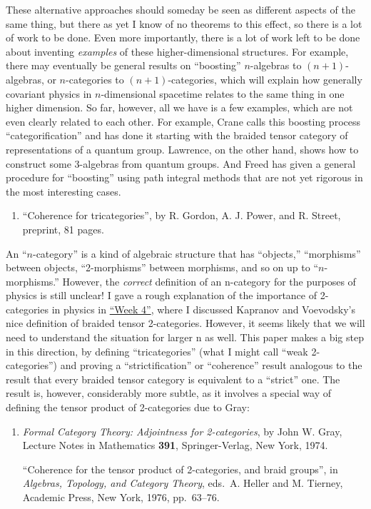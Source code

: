 \documentclass{article}
\def\tightlist{}
\begin{document}
These alternative approaches should someday be seen as different aspects
of the same thing, but there as yet I know of no theorems to this
effect, so there is a lot of work to be done. Even more importantly,
there is a lot of work left to be done about inventing \emph{examples}
of these higher-dimensional structures. For example, there may
eventually be general results on ``boosting'' \(n\)-algebras to
\((n+1)\)-algebras, or \(n\)-categories to \((n+1)\)-categories, which
will explain how generally covariant physics in \(n\)-dimensional
spacetime relates to the same thing in one higher dimension. So far,
however, all we have is a few examples, which are not even clearly
related to each other. For example, Crane calls this boosting process
``categorification'' and has done it starting with the braided tensor
category of representations of a quantum group. Lawrence, on the other
hand, shows how to construct some 3-algebras from quantum groups. And
Freed has given a general procedure for ``boosting'' using path integral
methods that are not yet rigorous in the most interesting cases.

\begin{enumerate}
\def\labelenumi{\arabic{enumi})}
\setcounter{enumi}{1}
\tightlist
\item
  ``Coherence for tricategories'', by R. Gordon, A. J. Power, and R.
  Street, preprint, 81 pages.
\end{enumerate}

An ``\(n\)-category'' is a kind of algebraic structure that has
``objects,'' ``morphisms'' between objects, ``2-morphisms'' between
morphisms, and so on up to ``\(n\)-morphisms.'' However, the
\emph{correct} definition of an n-category for the purposes of physics
is still unclear! I gave a rough explanation of the importance of
2-categories in physics in \protect\hyperlink{week4}{``Week 4''}, where
I discussed Kapranov and Voevodsky's nice definition of braided tensor
2-categories. However, it seems likely that we will need to understand
the situation for larger n as well. This paper makes a big step in this
direction, by defining ``tricategories'' (what I might call ``weak
2-categories'') and proving a ``strictification'' or ``coherence''
result analogous to the result that every braided tensor category is
equivalent to a ``strict'' one. The result is, however, considerably
more subtle, as it involves a special way of defining the tensor product
of 2-categories due to Gray:

\begin{enumerate}
\def\labelenumi{\arabic{enumi})}
\setcounter{enumi}{2}
\item
  \emph{Formal Category Theory: Adjointness for 2-categories}, by John
  W. Gray, Lecture Notes in Mathematics \textbf{391}, Springer-Verlag,
  New York, 1974.

  ``Coherence for the tensor product of 2-categories, and braid
  groups'', in \emph{Algebras, Topology, and Category Theory}, eds.~A.
  Heller and M. Tierney, Academic Press, New York, 1976, pp.~63--76.
\end{enumerate}
\end{document}
